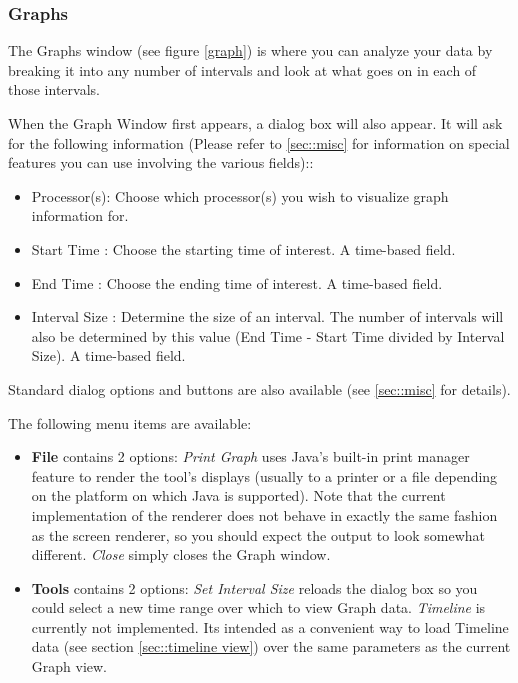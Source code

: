 \documentclass[10pt]{article}
\begin{document}
\subsubsection{Graphs}
\label{sec::graph view}


The Graphs window (see figure \ref{graph}) is where you can analyze your data by breaking it
into any number of intervals and look at what goes on in each of those
intervals.


When the Graph Window first appears, a dialog box will also appear. It
will ask for the following information (Please refer to
\ref{sec::misc} for information on special features you can
use involving the various fields)::

\begin{itemize}
\item
Processor(s): Choose which processor(s) you wish to visualize graph 
information for.
\item
Start Time : Choose the starting time of interest. A time-based field.
\item
End Time : Choose the ending time of interest. A time-based field.
\item
Interval Size : Determine the size of an interval. The number of intervals
will also be determined by this value (End Time - Start Time divided by
Interval Size). A time-based field.
\end{itemize}

Standard \projections{} dialog options and buttons are also available
(see \ref{sec::misc} for details).

The following menu items are available:

\begin{itemize}
\item
{\bf File} contains 2 options: {\it Print Graph} uses Java's built-in 
print manager feature to render the tool's displays (usually to a printer 
or a file depending on the platform on which Java is supported). Note that
the current implementation of the renderer does not behave in exactly the
same fashion as the screen renderer, so you should expect the output to look
somewhat different. {\it Close} simply closes the Graph window.
\item
{\bf Tools} contains 2 options: {\it Set Interval Size} reloads the dialog
box so you could select a new time range over which to view Graph data.
{\it Timeline} is currently not implemented. Its intended as a convenient
way to load Timeline data (see section \ref{sec::timeline view}) over the 
same parameters as the current Graph view.
\end{itemize}
\end{document}
